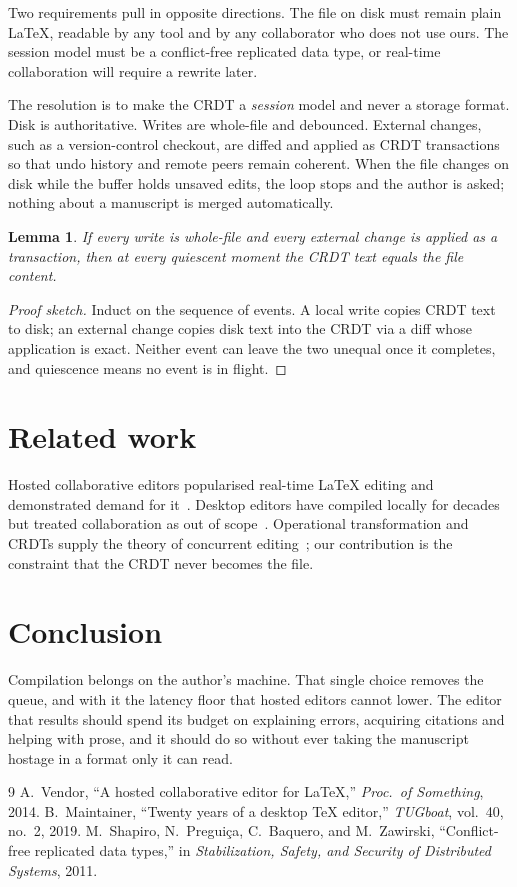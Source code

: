 \documentclass[11pt,a4paper]{article}
\newtheorem{lemma}[theorem]{Lemma}
\theoremstyle{definition}
\begin{document}
Two requirements pull in opposite directions. The file on disk must remain plain \LaTeX{},
readable by any tool and by any collaborator who does not use ours. The session model must be a
conflict-free replicated data type, or real-time collaboration will require a rewrite later.

The resolution is to make the CRDT a \emph{session} model and never a storage format. Disk is
authoritative. Writes are whole-file and debounced. External changes, such as a version-control
checkout, are diffed and applied as CRDT transactions so that undo history and remote peers
remain coherent. When the file changes on disk while the buffer holds unsaved edits, the loop
stops and the author is asked; nothing about a manuscript is merged automatically.

\begin{lemma}
  If every write is whole-file and every external change is applied as a transaction, then at
  every quiescent moment the CRDT text equals the file content.
\end{lemma}

\begin{proof}[Proof sketch]
  Induct on the sequence of events. A local write copies CRDT text to disk; an external change
  copies disk text into the CRDT via a diff whose application is exact. Neither event can leave
  the two unequal once it completes, and quiescence means no event is in flight.
\end{proof}

\section{Related work}

Hosted collaborative editors popularised real-time \LaTeX{} editing and demonstrated demand for
it~\cite{hosted}. Desktop editors have compiled locally for decades but treated collaboration as
out of scope~\cite{desktop}. Operational transformation and CRDTs supply the theory of
concurrent editing~\cite{crdt}; our contribution is the constraint that the CRDT never becomes
the file.

\section{Conclusion}

Compilation belongs on the author's machine. That single choice removes the queue, and with it
the latency floor that hosted editors cannot lower. The editor that results should spend its
budget on explaining errors, acquiring citations and helping with prose, and it should do so
without ever taking the manuscript hostage in a format only it can read.

\begin{thebibliography}{9}
   A.~Vendor, ``A hosted collaborative editor for \LaTeX{},'' \emph{Proc.\ of
    Something}, 2014.
   B.~Maintainer, ``Twenty years of a desktop \TeX{} editor,'' \emph{TUGboat},
    vol.~40, no.~2, 2019.
   M.~Shapiro, N.~Pregui\c{c}a, C.~Baquero, and M.~Zawirski, ``Conflict-free
    replicated data types,'' in \emph{Stabilization, Safety, and Security of Distributed
    Systems}, 2011.
\end{thebibliography}
\end{document}
